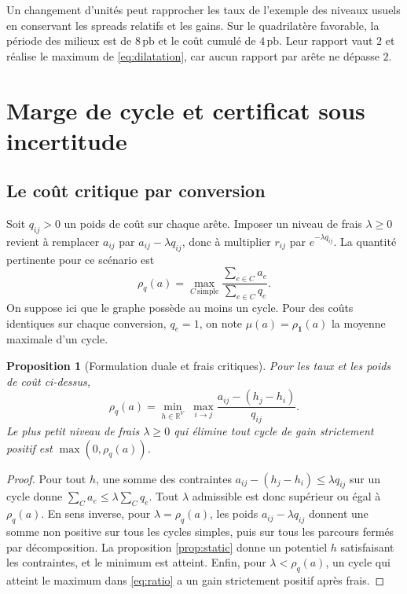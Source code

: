 \documentclass[11pt,a4paper]{article}
\theoremstyle{clair}
\newtheorem{proposition}{Proposition}[section]
\newcommand{\R}{\mathbb{R}}
\newcommand{\pb}{\,\mathrm{pb}}
\newcommand{\arrowfx}{\mathbin{\to}}
\begin{document}
Un changement d'unités peut rapprocher les taux de l'exemple des niveaux usuels en conservant les spreads relatifs et les gains. Sur le quadrilatère favorable, la période des milieux est de \(8\pb\) et le coût cumulé de \(4\pb\). Leur rapport vaut \(2\) et réalise le maximum de \eqref{eq:dilatation}, car aucun rapport par arête ne dépasse \(2\).

\clearpage
\section{Marge de cycle et certificat sous incertitude}
\label{sec:marge}
\subsection{Le coût critique par conversion}

Soit $q_{ij}>0$ un poids de coût sur chaque arête. Imposer un niveau de frais $\lambda\ge0$ revient à remplacer $a_{ij}$ par $a_{ij}-\lambda q_{ij}$, donc à multiplier $r_{ij}$ par $e^{-\lambda q_{ij}}$. La quantité pertinente pour ce scénario est
\begin{equation}
 \rho_q(a)=\max_{C\ \mathrm{simple}}\frac{\sum_{e\in C}a_e}{\sum_{e\in C}q_e}.
 \label{eq:ratio}
\end{equation}
On suppose ici que le graphe possède au moins un cycle. Pour des coûts identiques sur chaque conversion, $q_e=1$, on note $\mu(a)=\rho_{\boldsymbol{1}}(a)$ la moyenne maximale d'un cycle.

\begin{proposition}[Formulation duale et frais critiques]
\label{prop:dual}
Pour les taux et les poids de coût ci-dessus,
\begin{equation}
 \rho_q(a)=\min_{h\in\R^V}\;\max_{i\arrowfx j}
              \frac{a_{ij}-(h_j-h_i)}{q_{ij}}.
 \label{eq:dual}
\end{equation}
Le plus petit niveau de frais $\lambda\ge0$ qui élimine tout cycle de gain strictement positif est $\max(0,\rho_q(a))$.
\end{proposition}
\begin{proof}
Pour tout $h$, une somme des contraintes $a_{ij}-(h_j-h_i)\le\lambda q_{ij}$ sur un cycle donne $\sum_C a_e\le\lambda\sum_Cq_e$. Tout $\lambda$ admissible est donc supérieur ou égal à $\rho_q(a)$. En sens inverse, pour $\lambda=\rho_q(a)$, les poids $a_{ij}-\lambda q_{ij}$ donnent une somme non positive sur tous les cycles simples, puis sur tous les parcours fermés par décomposition. La proposition \ref{prop:static} donne un potentiel $h$ satisfaisant les contraintes, et le minimum est atteint. Enfin, pour $\lambda<\rho_q(a)$, un cycle qui atteint le maximum dans \eqref{eq:ratio} a un gain strictement positif après frais.
\end{proof}
\end{document}
